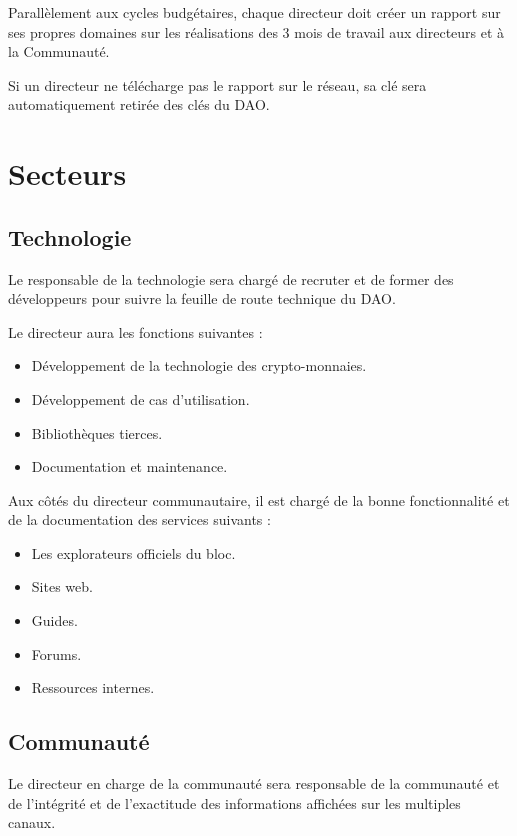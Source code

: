 \documentclass{article}
\begin{document}
Parallèlement aux cycles budgétaires, chaque directeur doit créer un rapport sur ses propres domaines sur les réalisations des 3 mois de travail aux directeurs et à la Communauté.

Si un directeur ne télécharge pas le rapport sur le réseau, sa clé sera automatiquement retirée des clés du DAO.

\section{Secteurs}

\subsection{Technologie}

Le responsable de la technologie sera chargé de recruter et de former des développeurs pour suivre la feuille de route technique du DAO.

Le directeur aura les fonctions suivantes :

\begin{itemize}
  \item Développement de la technologie des crypto-monnaies.
  \item Développement de cas d'utilisation.
  \item Bibliothèques tierces.
  \item Documentation et maintenance.
\end{itemize}

Aux côtés du directeur communautaire, il est chargé de la bonne fonctionnalité et de la documentation des services suivants :

\begin{itemize}
  \item Les explorateurs officiels du bloc.
  \item Sites web.
  \item Guides.
  \item Forums.
  \item Ressources internes.
\end{itemize}

\subsection{Communauté}

Le directeur en charge de la communauté sera responsable de la communauté et de l'intégrité et de l'exactitude des informations affichées sur les multiples canaux.
\end{document}
